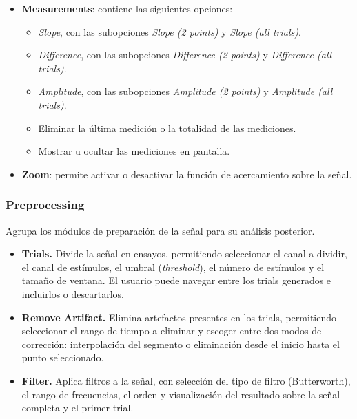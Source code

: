 \documentclass[12pt, letterpaper]{article}
\begin{document}
\begin{itemize}

    \item \textbf{Measurements}: contiene las siguientes opciones:

    \begin{itemize}

        \item \textit{Slope}, con las subopciones \textit{Slope (2 points)} y
        \textit{Slope (all trials)}.

        \item \textit{Difference}, con las subopciones \textit{Difference (2 points)}
        y \textit{Difference (all trials)}.

        \item \textit{Amplitude}, con las subopciones \textit{Amplitude (2 points)}
        y \textit{Amplitude (all trials)}.

        \item Eliminar la última medición o la totalidad de las mediciones.

        \item Mostrar u ocultar las mediciones en pantalla.

    \end{itemize}

    \item \textbf{Zoom}: permite activar o desactivar la función de
    acercamiento sobre la señal.

\end{itemize}

\subsubsection{Preprocessing}

Agrupa los módulos de preparación de la señal para su análisis posterior.

\begin{itemize}

    \item \textbf{Trials.} Divide la señal en ensayos, permitiendo
    seleccionar el canal a dividir, el canal de estímulos, el umbral
    (\textit{threshold}), el número de estímulos y el tamaño de ventana. El
    usuario puede navegar entre los trials generados e incluirlos o
    descartarlos.

    \item \textbf{Remove Artifact.} Elimina artefactos presentes en los
    trials, permitiendo seleccionar el rango de tiempo a eliminar y escoger
    entre dos modos de corrección: interpolación del segmento o eliminación
    desde el inicio hasta el punto seleccionado.

    \item \textbf{Filter.} Aplica filtros a la señal, con selección del tipo
    de filtro (Butterworth), el rango de frecuencias, el orden y
    visualización del resultado sobre la señal completa y el primer trial.

\end{itemize}
\end{document}

